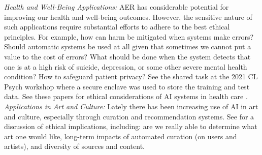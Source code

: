 \documentclass{clv3}
\begin{document}
\vspace*{-1mm}

\noindent \textit{Health and Well-Being Applications:} AER has considerable potential for improving our health and well-being outcomes. However, the sensitive nature of such applications require substantial efforts to adhere to the best ethical principles. For example, how can harm be mitigated when systems make errors? Should automatic systems be used at all given that sometimes we cannot put a value to the cost of errors? What should be done when the system detects that one is at a high risk of suicide, depression, or some other severe mental health condition? How to safeguard patient privacy? See the shared task at the 2021 CL Psych workshop where a secure enclave was used to store the training and test data. %
See these papers for ethical considerations of AI systems in health care 
\cite{yu2018artificial,lysaght2019ai,panesar2019machine}.\\

\noindent \textit{Applications in Art and Culture:} Lately there has been increasing use of AI in art and culture, especially through curation and recommendation systems. See \citet{Born21} for a discussion of ethical implications, including: are we really able to determine what art one would like, long-term impacts of automated curation (on users and artists), and diversity of sources and content.
\end{document}
